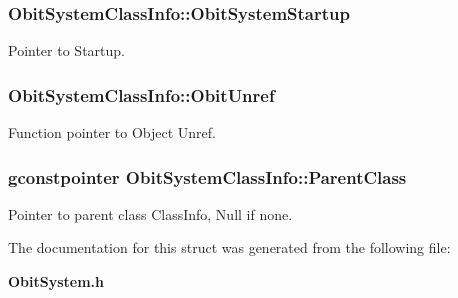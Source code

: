 \subsubsection{ {\bf Obit\-System\-Class\-Info::Obit\-System\-Startup}}\label{structObitSystemClassInfo_o15}


Pointer to Startup. 

\subsubsection{ {\bf Obit\-System\-Class\-Info::Obit\-Unref}}\label{structObitSystemClassInfo_o11}


Function pointer to Object Unref. 

\subsubsection{\setlength{\rightskip}{0pt plus 5cm}gconstpointer {\bf Obit\-System\-Class\-Info::Parent\-Class}}\label{structObitSystemClassInfo_o3}


Pointer to parent class Class\-Info, Null if none. 



The documentation for this struct was generated from the following file:\begin{CompactItemize}
\item 
{\bf Obit\-System.h}\end{CompactItemize}
